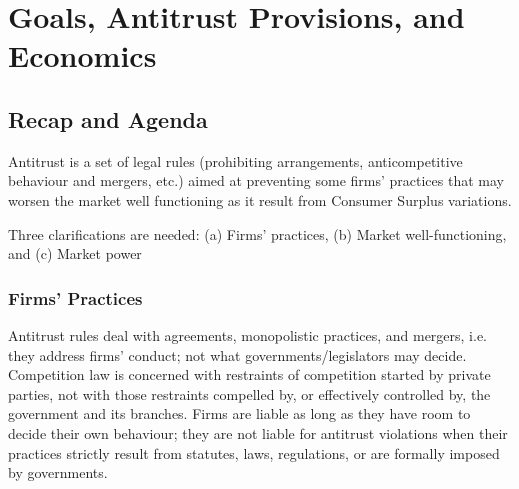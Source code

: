 \setcounter{chapter}{2}
\chapter{Goals, Antitrust Provisions, and Economics}
\vspace{-1.5cm}

{\chaptoc\noindent\begin{minipage}[inner sep=0,outer sep=0]{0.9\linewidth}\section{Recap and Agenda}\end{minipage}}

        Antitrust is a set of legal rules (prohibiting arrangements, anticompetitive behaviour and mergers, etc.) aimed at preventing some firms’ practices that may worsen the market well functioning as it result from Consumer Surplus variations.
        
        Three clarifications are needed: (a) Firms’ practices, (b) Market well-functioning, and (c) Market power

    \subsection{Firms' Practices}

        Antitrust rules deal with agreements, monopolistic practices, and mergers, i.e. they address firms’ conduct; not what governments/legislators may decide. Competition law is concerned with restraints of competition started by private parties, not with those restraints compelled by, or effectively controlled by, the government and its branches. Firms are liable as long as they have room to decide their own behaviour; they are not liable for antitrust violations when their practices strictly result from statutes, laws, regulations, or are formally imposed by governments. \\

